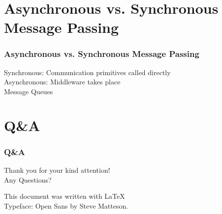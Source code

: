 \documentclass[aspectratio=169]{beamer}
\begin{document}
\section{Asynchronous vs. Synchronous Message Passing}
\begin{frame}

\frametitle{Asynchronous vs. Synchronous Message Passing}

Synchronous: Communication primitives called directly\\
Asynchronous: Middleware takes place\\
Message Queues

\end{frame}

\section{Q\&A}
\begin{frame}

\frametitle{Q\&A}

Thank you for your kind attention!\\
Any Questions?

\vfill
\begin{center}
This document was written with \LaTeX 
\\Typeface: Open Sans by Steve Matteson.
\end{center}

\end{frame}


\end{document}
